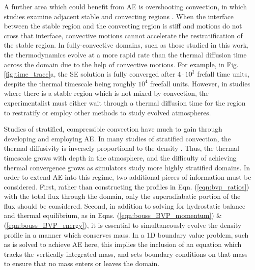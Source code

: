 \documentclass[aps, pre, onecolumn, nofootinbib, notitlepage, groupedaddress, amsfonts, amssymb, amsmath, longbibliography]{revtex4-1}
\begin{document}
A further area which could benefit from AE is overshooting convection, in which
studies examine adjacent stable and convecting regions
\cite{hurlburt&all1986, brandenburg&all2005, couston&all2017}.
When the interface between the stable region
and the convecting region is stiff and motions do not cross that interface,
convective motions cannot accelerate the restratification of the stable region.
In fully-convective domains, such as those studied in this work, the thermodynamics evolve
at a more rapid rate than the thermal diffusion time across the domain due to
the help of convective motions.  For example, in Fig. \ref{fig:time_trace}a,
the SE solution is fully converged after $4\cdot 10^3$ frefall time units,
despite the thermal timescale being roughly $10^4$ freefall units. However, in 
studies where there is a stable region which is not mixed by convection, the experimentalist
must either wait through a thermal diffusion time for the region to restratify
or employ other methods \cite{couston&all2017} to study evolved atmospheres.


Studies of stratified, compressible convection have much to gain through
developing and employing AE.
In many studies of stratified convection, the thermal diffusivity
is inversely proportional to the density \cite{anders&brown2017}. Thus, the
thermal timescale grows with depth in the atmosphere, and
the difficulty of achieving thermal convergence grows as simulators study more highly
stratified domains.
In order to extend AE into this regime, two additional pieces of information must be considered.
First, rather than constructing the profiles in Eqn. (\ref{eqn:bvp_ratios})
with the total flux through the domain, only the superadiabatic portion of
the flux should be considered.
Second, in addition to solving for
hydrostatic balance and thermal equilibrium, as in Eqns. (\ref{eqn:bouss_BVP_momentum})
\& (\ref{eqn:bouss_BVP_energy}), it is essential to simultaneously evolve the density
profile in a manner which conserves mass.  In a 1D boundary value problem, such as
is solved to achieve AE here, this implies the inclusion of an equation which tracks
the vertically integrated mass, and sets boundary conditions on that mass to ensure
that no mass enters or leaves the domain.  
\end{document}
